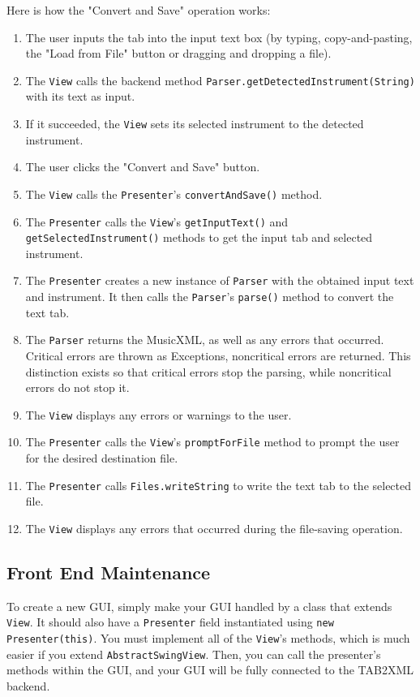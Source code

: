 \documentclass[11pt]{article}
\begin{document}
Here is how the "Convert and Save" operation works:
\begin{enumerate}
\item The user inputs the tab into the input text box (by typing, copy-and-pasting, the "Load from File" button or dragging and dropping a file).
\item The \texttt{View} calls the backend method \texttt{Parser.getDetectedInstrument(String)} with its text as input.
\item If it succeeded, the \texttt{View} sets its selected instrument to the detected instrument.
\item The user clicks the "Convert and Save" button.
\item The \texttt{View} calls the \texttt{Presenter}'s \texttt{convertAndSave()} method.
\item The \texttt{Presenter} calls the \texttt{View}'s \texttt{getInputText()} and \texttt{getSelectedInstrument()} methods to get the input tab and selected instrument.
\item The \texttt{Presenter} creates a new instance of \texttt{Parser} with the obtained input text and instrument.  It then calls the \texttt{Parser}'s \texttt{parse()} method to convert the text tab.
\item The \texttt{Parser} returns the MusicXML, as well as any errors that occurred.  Critical errors are thrown as Exceptions, noncritical errors are returned.  This distinction exists so that critical errors stop the parsing, while noncritical errors do not stop it.
\item The \texttt{View} displays any errors or warnings to the user.
\item The \texttt{Presenter} calls the \texttt{View}'s \texttt{promptForFile} method to prompt the user for the desired destination file.
\item The \texttt{Presenter} calls \texttt{Files.writeString} to write the text tab to the selected file.
\item The \texttt{View} displays any errors that occurred during the file-saving operation.
\end{enumerate}
\subsection{Front End Maintenance}
\label{sec:orgc79e91f}
To create a new GUI, simply make your GUI handled by a class that extends \texttt{View}.  It should also have a \texttt{Presenter} field instantiated using \texttt{new Presenter(this)}.  You must implement all of the \texttt{View}'s methods, which is much easier if you extend \texttt{AbstractSwingView}.  Then, you can call the presenter's methods within the GUI, and your GUI will be fully connected to the TAB2XML backend.
\end{document}
